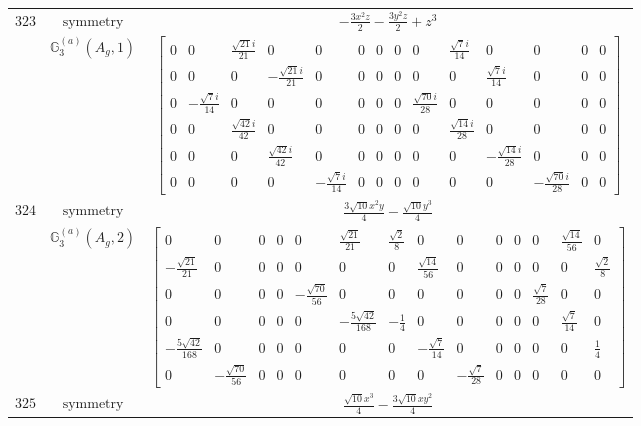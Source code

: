 \documentclass[fleqn,8pt,landscape]{jsarticle}
\begin{document}
\begin{longtable}{ccc}
$ 323 $ & $ \text{symmetry} $ & $ - \frac{3 x^{2} z}{2} - \frac{3 y^{2} z}{2} + z^{3} $ \\
$  $ & $ \mathbb{G}_{3}^{(a)}(A_{g},1) $ & $ \begin{bmatrix} 0 & 0 & \frac{\sqrt{21} i}{21} & 0 & 0 & 0 & 0 & 0 & 0 & \frac{\sqrt{7} i}{14} & 0 & 0 & 0 & 0 \\ 0 & 0 & 0 & - \frac{\sqrt{21} i}{21} & 0 & 0 & 0 & 0 & 0 & 0 & \frac{\sqrt{7} i}{14} & 0 & 0 & 0 \\ 0 & - \frac{\sqrt{7} i}{14} & 0 & 0 & 0 & 0 & 0 & 0 & \frac{\sqrt{70} i}{28} & 0 & 0 & 0 & 0 & 0 \\ 0 & 0 & \frac{\sqrt{42} i}{42} & 0 & 0 & 0 & 0 & 0 & 0 & \frac{\sqrt{14} i}{28} & 0 & 0 & 0 & 0 \\ 0 & 0 & 0 & \frac{\sqrt{42} i}{42} & 0 & 0 & 0 & 0 & 0 & 0 & - \frac{\sqrt{14} i}{28} & 0 & 0 & 0 \\ 0 & 0 & 0 & 0 & - \frac{\sqrt{7} i}{14} & 0 & 0 & 0 & 0 & 0 & 0 & - \frac{\sqrt{70} i}{28} & 0 & 0 \end{bmatrix} $ \\ \hline
$ 324 $ & $ \text{symmetry} $ & $ \frac{3 \sqrt{10} x^{2} y}{4} - \frac{\sqrt{10} y^{3}}{4} $ \\
$  $ & $ \mathbb{G}_{3}^{(a)}(A_{g},2) $ & $ \begin{bmatrix} 0 & 0 & 0 & 0 & 0 & \frac{\sqrt{21}}{21} & \frac{\sqrt{2}}{8} & 0 & 0 & 0 & 0 & 0 & \frac{\sqrt{14}}{56} & 0 \\ - \frac{\sqrt{21}}{21} & 0 & 0 & 0 & 0 & 0 & 0 & \frac{\sqrt{14}}{56} & 0 & 0 & 0 & 0 & 0 & \frac{\sqrt{2}}{8} \\ 0 & 0 & 0 & 0 & - \frac{\sqrt{70}}{56} & 0 & 0 & 0 & 0 & 0 & 0 & \frac{\sqrt{7}}{28} & 0 & 0 \\ 0 & 0 & 0 & 0 & 0 & - \frac{5 \sqrt{42}}{168} & - \frac{1}{4} & 0 & 0 & 0 & 0 & 0 & \frac{\sqrt{7}}{14} & 0 \\ - \frac{5 \sqrt{42}}{168} & 0 & 0 & 0 & 0 & 0 & 0 & - \frac{\sqrt{7}}{14} & 0 & 0 & 0 & 0 & 0 & \frac{1}{4} \\ 0 & - \frac{\sqrt{70}}{56} & 0 & 0 & 0 & 0 & 0 & 0 & - \frac{\sqrt{7}}{28} & 0 & 0 & 0 & 0 & 0 \end{bmatrix} $ \\ \hline
$ 325 $ & $ \text{symmetry} $ & $ \frac{\sqrt{10} x^{3}}{4} - \frac{3 \sqrt{10} x y^{2}}{4} $ \\

\end{longtable}
\end{document}
